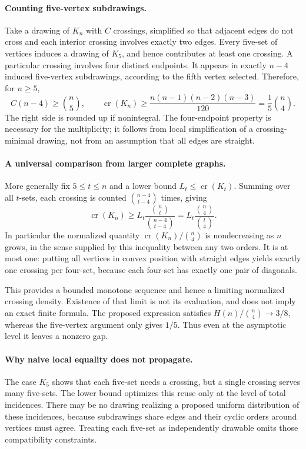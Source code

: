 \documentclass[11pt,a4paper]{article}
\begin{document}
\paragraph{Counting five-vertex subdrawings.}
Take a drawing of $K_n$ with $C$ crossings, simplified so that adjacent edges do not cross and each interior crossing involves exactly two edges. Every five-set of vertices induces a drawing of $K_5$, and hence contributes at least one crossing. A particular crossing involves four distinct endpoints. It appears in exactly $n-4$ induced five-vertex subdrawings, according to the fifth vertex selected. Therefore, for $n\ge5$,
\[
C(n-4)\ge\binom n5,\qquad
\operatorname{cr}(K_n)\ge\frac{n(n-1)(n-2)(n-3)}{120}
=\frac15\binom n4.
\]
The right side is rounded up if nonintegral. The four-endpoint property is necessary for the multiplicity; it follows from local simplification of a crossing-minimal drawing, not from an assumption that all edges are straight.

\paragraph{A universal comparison from larger complete graphs.}
More generally fix $5\le t\le n$ and a lower bound $L_t\le\operatorname{cr}(K_t)$. Summing over all $t$-sets, each crossing is counted $\binom{n-4}{t-4}$ times, giving
\[
\operatorname{cr}(K_n)\ge
L_t\frac{\binom nt}{\binom{n-4}{t-4}}
=L_t\frac{\binom n4}{\binom t4}.
\]
In particular the normalized quantity $\operatorname{cr}(K_n)/\binom n4$ is nondecreasing as $n$ grows, in the sense supplied by this inequality between any two orders. It is at most one: putting all vertices in convex position with straight edges yields exactly one crossing per four-set, because each four-set has exactly one pair of diagonals.

This provides a bounded monotone sequence and hence a limiting normalized crossing density. Existence of that limit is not its evaluation, and does not imply an exact finite formula. The proposed expression satisfies $H(n)/\binom n4\to3/8$, whereas the five-vertex argument only gives $1/5$. Thus even at the asymptotic level it leaves a nonzero gap.

\paragraph{Why naive local equality does not propagate.}
The case $K_5$ shows that each five-set needs a crossing, but a single crossing serves many five-sets. The lower bound optimizes this reuse only at the level of total incidences. There may be no drawing realizing a proposed uniform distribution of these incidences, because subdrawings share edges and their cyclic orders around vertices must agree. Treating each five-set as independently drawable omits those compatibility constraints.
\end{document}
